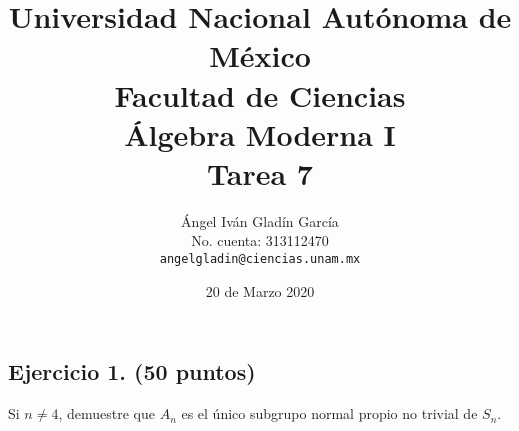 \documentclass[letterpaper]{article}
\begin{document}
\title{
    \vspace{-2.2em}
        Universidad Nacional Autónoma de México\\
        Facultad de Ciencias\\
        Álgebra Moderna I\\
    \vspace{.5cm}
    \large
        \textbf{Tarea 7}
}
\author{
    Ángel Iván Gladín García\\
    No. cuenta: 313112470\\
    \texttt{angelgladin@ciencias.unam.mx}
}
\date{20 de Marzo 2020}
\maketitle

\newtheorem{theorem}{Teorema}
\newtheorem{example}{Ejemplo}
\newtheorem{corollary}{Corolario}
\newtheorem{lemma}{Lemma}
\newtheorem{definition}{Definicion}
\newtheorem{prop}{Proposicion}

\subsection*{Ejercicio 1. (50 puntos)}
Si $n \neq 4$, demuestre que $A_n$ es el único subgrupo normal propio no trivial de $S_n$.
\end{document}
